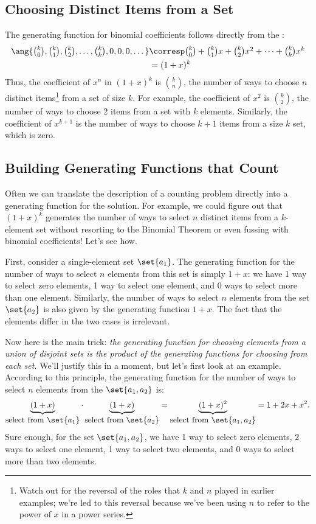 \subsection{Choosing Distinct Items from a Set}

The generating function for binomial coefficients follows directly
from the :
%
\begin{align*}
\ang{\textstyle \binom{k}{0}, \binom{k}{1}, \binom{k}{2}, \dots, \binom{k}{k},
        0, 0, 0, \dots }
    & \corresp \textstyle \binom{k}{0} + \binom{k}{1} x + \binom{k}{2} x^2 + \cdots + \binom{k}{k} x^k \\
    & = (1 + x)^k
\end{align*}
Thus, the coefficient of $x^n$ in $(1 + x)^k$ is $\binom{k}{n}$, the
number of ways to choose $n$ distinct items\footnote{Watch out for the
  reversal of the roles that $k$ and $n$ played in earlier examples;
  we're led to this reversal because we've been using $n$ to refer to
  the power of $x$ in a power series.}  from a set of size $k$.  For
example, the coefficient of $x^2$ is $\binom{k}{2}$, the number of
ways to choose 2 items from a set with $k$ elements.  Similarly, the
coefficient of $x^{k+1}$ is the number of ways to choose $k+1$ items
from a size $k$ set, which is zero.

\subsection{Building Generating Functions that Count}

Often we can translate the description of a counting problem directly
into a generating function for the solution.  For example, we could
figure out that $(1 + x)^k$ generates the number of ways to select $n$
distinct items from a $k$-element set without resorting to the
Binomial Theorem or even fussing with binomial coefficients!  Let's
see how.

First, consider a single-element set $\set{a_1}$.  The
generating function for the number of ways to select $n$ elements from
this set is simply $1 + x$: we have 1 way to select zero elements, 1
way to select one element, and 0 ways to select more than one element.
Similarly, the number of ways to select $n$ elements from the set
$\set{a_2}$ is also given by the generating function $1 + x$.  The
fact that the elements differ in the two cases is irrelevant.

Now here is the main trick: \emph{the generating function for choosing
  elements from a union of disjoint sets is the product of the
  generating functions for choosing from each set.}  We'll justify
this in a moment, but let's first look at an example.  According to
this principle, the generating function for the number of ways to
select $n$ elements from the $\set{a_1, a_2}$ is:
%
\[
\underbrace{(1 + x)}_{\textstyle\text{select from $\set{a_1}$}}
\cdot
\underbrace{(1 + x)}_{\textstyle\text{select from $\set{a_2}$}}
=
\underbrace{(1 + x)^2}_{\textstyle\text{select from $\set{a_1, a_2}$}}
= 1 + 2x + x^2.
\]
%
Sure enough, for the set $\set{a_1, a_2}$, we have 1 way to select
zero elements, 2 ways to select one element, 1 way to select two
elements, and 0 ways to select more than two elements.

